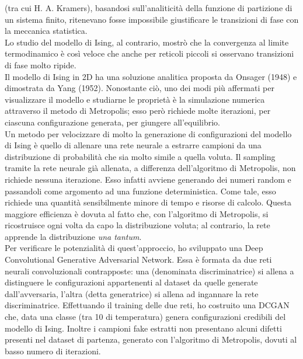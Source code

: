 \documentclass[Lau, noexaminfo, oneside]{sapthesis} %
\begin{document}
(tra cui H. A. Kramers), basandosi sull'analiticità della funzione di partizione di un sistema finito, ritenevano fosse impossibile giustificare le transizioni di fase con la meccanica statistica. \cite{Kadanoff2009} \\
Lo studio del modello di Ising, al contrario, mostrò che la convergenza al limite termodinamico è così veloce che anche per reticoli piccoli si osservano transizioni di fase molto ripide.\\
Il modello di Ising in 2D ha una soluzione analitica proposta da Onsager (1948) e dimostrata da Yang (1952). Nonostante ciò, uno dei modi più affermati per visualizzare il modello e studiarne le proprietà è la simulazione numerica attraverso il metodo di Metropolis; esso però richiede molte iterazioni, per ciascuna configurazione generata, per giungere all'equilibrio. \\
Un metodo per velocizzare di molto la generazione di configurazioni del modello di Ising è quello di allenare una rete neurale a estrarre campioni da una distribuzione di probabilità che sia molto simile a quella voluta. Il sampling tramite la rete neurale già allenata, a differenza dell'algoritmo di Metropolis, non richiede nessuna iterazione. Esso infatti avviene generando dei numeri random e passandoli come argomento ad una funzione deterministica. Come tale, esso richiede una quantità sensibilmente minore di tempo e risorse di calcolo. Questa maggiore efficienza è dovuta al fatto che, con l'algoritmo di Metropolis, si ricostruisce ogni volta da capo la distribuzione voluta; al contrario, la rete apprende la distribuzione \textit{una tantum}. \\
Per verificare le potenzialità di quest'approccio, ho sviluppato una Deep Convolutional Generative Adversarial Network. Essa è formata da due reti neurali convoluzionali contrapposte: una (denominata discriminatrice) si allena a distinguere le configurazioni appartenenti al dataset da quelle generate dall'avversaria, l'altra (detta generatrice) si allena ad ingannare la rete discriminatrice. Effettuando il training delle due reti, ho costruito una DCGAN che, data una classe (tra 10 di temperatura) genera configurazioni credibili del modello di Ising. Inoltre i campioni fake estratti non presentano alcuni difetti presenti nel dataset di partenza, generato con l'algoritmo di Metropolis, dovuti al basso numero di iterazioni.
\end{document}
